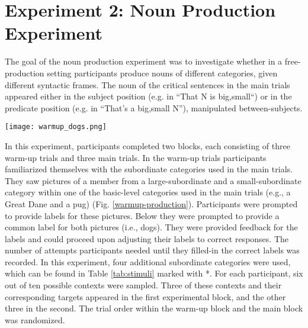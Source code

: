 \section{Experiment 2: Noun Production Experiment}    


The goal of the noun production experiment was to investigate whether in a free-production setting participants produce nouns of different categories, given different syntactic frames.  The noun of the critical sentences in the main trials appeared either in the subject position (e.g. in “That N is {big,small}“) or in the predicate position (e.g. in “That’s a {big,small} N”), manipulated between-subjects. 

\begin{figure*}[t]
	\begin{center}
		\texttt{[image: warmup\_dogs.png]}
	\end{center}
	\caption{Example view of the noun production warm-up trial involving subordinate targets for the dogs-category.}
	\label{warmup-production}
\end{figure*}
In this experiment, participants completed two blocks, each consisting of three warm-up trials and three main trials. In the warm-up trials participants familiarized themselves with the subordinate categories used in the main trials. They saw pictures of a member from a large-subordinate and a small-subordinate category within one of the basic-level categories used in the main trials (e.g., a Great Dane and a pug) (Fig. \ref{warmup-production}). Participants were prompted to provide labels for these pictures. Below they were prompted to provide a common label for both pictures (i.e., dogs). They were provided feedback for the labels and could proceed upon adjusting their labels to correct responses. The number of attempts participants needed until they filled-in the correct labels was recorded. In this experiment, four additional subordinate categories were used, which can be found in Table \ref{tab:stimuli} marked with *. For each participant, six out of ten possible contexts were sampled. Three of these contexts and their corresponding targets appeared in the first experimental block, and the other three in the second. The trial order within the warm-up block and the main block was randomized. 

